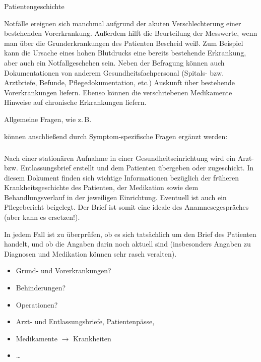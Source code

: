 \TextSlide
{ Patientengeschichte}
{Notfälle ereignen sich manchmal aufgrund der akuten
Verschlechterung einer bestehenden Vorerkrankung. Außerdem
hilft die Beurteilung der Messwerte, wenn man über die
Grunderkrankungen des Patienten Bescheid weiß. Zum Beispiel
kann die Ursache eines hohen Blutdrucks eine bereits
bestehende Erkrankung, aber auch ein Notfallgeschehen sein.
Neben der Befragung können auch Dokumentationen von anderem
Gesundheitsfachpersonal (Spitals- bzw. Arztbriefe, Befunde,
Pflegedokumentation, etc.) Auskunft über bestehende
Vorerkrankungen liefern. 
%
Ebenso können die verschriebenen Medikamente Hinweise auf chronische Erkrankungen liefern.


Allgemeine Fragen,
wie z.\,B.
\begin{quote}
    
\end{quote}
können anschließend durch Symptom-spezifische Fragen ergänzt
werden:
\begin{quote}
    
    
\end{quote}

\subparagraph{}

Nach einer stationären Aufnahme in einer
Gesundheitseinrichtung wird ein Arzt- bzw. Entlassungsbrief
erstellt und dem Patienten übergeben oder zugeschickt. In
diesem Dokument finden sich wichtige Informationen bezüglich
der früheren Krankheitsgeschichte des Patienten, der
Medikation sowie dem Behandlungsverlauf in der jeweiligen
Einrichtung. Eventuell ist auch ein Pflegebericht beigelegt.
Der Brief ist somit eine ideale  des
Anamnesegespräches (aber kann es  ersetzen!).

In jedem Fall ist zu überprüfen, ob es sich tatsächlich um
den Brief des Patienten handelt, und ob die Angaben darin
noch aktuell sind (insbesonders Angaben zu Diagnosen und
Medikation können sehr rasch veralten).}
{
\begin{itemize}
  \item Grund- und Vorerkrankungen?
  \item Behinderungen?
  \item Operationen?
  \item Arzt- und Entlassungsbriefe, Patientenpässe, \item Medikamente $\rightarrow$ Krankheiten 
  \item \ldots
\end{itemize}
}
{}
{}
{}








